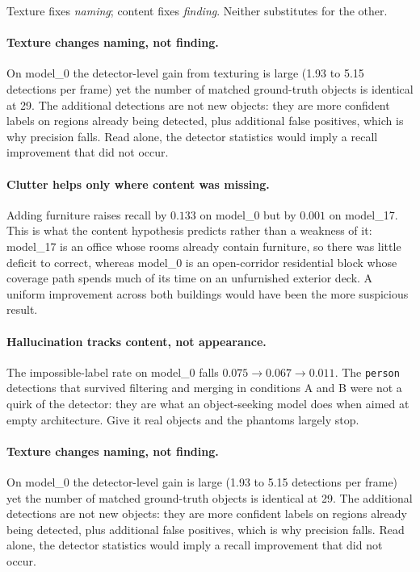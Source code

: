 \documentclass[11pt,a4paper]{article}
\begin{document}
Texture fixes \emph{naming}; content fixes \emph{finding}. Neither substitutes
for the other.

\paragraph{Texture changes naming, not finding.} On model\_0 the detector-level
gain from texturing is large (1.93 to 5.15 detections per frame) yet the number
of matched ground-truth objects is identical at 29. The additional detections
are not new objects: they are more confident labels on regions already being
detected, plus additional false positives, which is why precision falls. Read
alone, the detector statistics would imply a recall improvement that did not
occur.

\paragraph{Clutter helps only where content was missing.} Adding furniture
raises recall by $0.133$ on model\_0 but by $0.001$ on model\_17. This is what
the content hypothesis predicts rather than a weakness of it: model\_17 is an
office whose rooms already contain furniture, so there was little deficit to
correct, whereas model\_0 is an open-corridor residential block whose coverage
path spends much of its time on an unfurnished exterior deck. A uniform
improvement across both buildings would have been the more suspicious result.

\paragraph{Hallucination tracks content, not appearance.} The impossible-label
rate on model\_0 falls $0.075 \to 0.067 \to 0.011$. The \texttt{person}
detections that survived filtering and merging in conditions A and B were not a
quirk of the detector: they are what an object-seeking model does when aimed at
empty architecture. Give it real objects and the phantoms largely stop.

\paragraph{Texture changes naming, not finding.} On model\_0 the detector-level
gain is large (1.93 to 5.15 detections per frame) yet the number of matched
ground-truth objects is identical at 29. The additional detections are not new
objects: they are more confident labels on regions already being detected, plus
additional false positives, which is why precision falls. Read alone, the
detector statistics would imply a recall improvement that did not occur.
\end{document}
